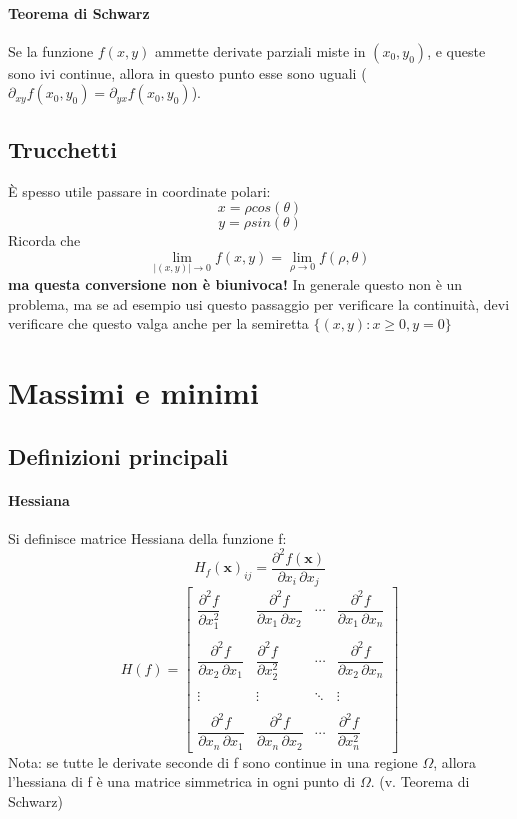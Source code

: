 \documentclass[a4paper,12pt]{article}
\begin{document}
\paragraph{Teorema di Schwarz}
Se la funzione $f(x,y)$ ammette derivate parziali miste in $(x_0, y_0)$, e queste sono ivi continue, allora in questo punto esse sono uguali ($\partial_{xy}f(x_0, y_0) = \partial_{yx}f(x_0, y_0)$).
\subsection{Trucchetti}
È spesso utile passare in coordinate polari: $$ x = \rho cos(\theta)$$ $$ y = \rho sin(\theta) $$
Ricorda che
$$ \lim_{|(x, y)| \to 0} f(x, y) = \lim_{\rho \to 0} f(\rho, \theta) $$
\textbf{ma questa conversione non è biunivoca!}
In generale questo non è un problema, ma se ad esempio usi questo passaggio per verificare la continuità, devi verificare che questo valga anche per la semiretta $\{(x, y) : x\geq 0, y=0\}$


\section{Massimi e minimi}
\subsection{Definizioni principali}

\paragraph{Hessiana}
Si definisce matrice Hessiana della funzione f:
$$  H_{f}(\mathbf{x})_{ij} = \frac{\partial^2 f(\mathbf{x})}{\partial x_i\, \partial x_j} $$
$$ H(f) = \begin{bmatrix} \dfrac{\partial^2 f}{\partial x_1^2} & \dfrac{\partial^2 f}{\partial x_1\,\partial x_2} & \cdots & \dfrac{\partial^2 f}{\partial x_1\,\partial x_n} \\ \\ \dfrac{\partial^2 f}{\partial x_2\,\partial x_1} & \dfrac{\partial^2 f}{\partial x_2^2} & \cdots & \dfrac{\partial^2 f}{\partial x_2\,\partial x_n} \\ \\ \vdots & \vdots & \ddots & \vdots \\ \\ \dfrac{\partial^2 f}{\partial x_n\,\partial x_1} & \dfrac{\partial^2 f}{\partial x_n\,\partial x_2} & \cdots & \dfrac{\partial^2 f}{\partial x_n^2} \end{bmatrix}$$
Nota: se tutte le derivate seconde di f sono continue in una regione $\Omega$, allora l'hessiana di f è una matrice simmetrica in ogni punto di $\Omega$. (v. Teorema di Schwarz)
\end{document}
